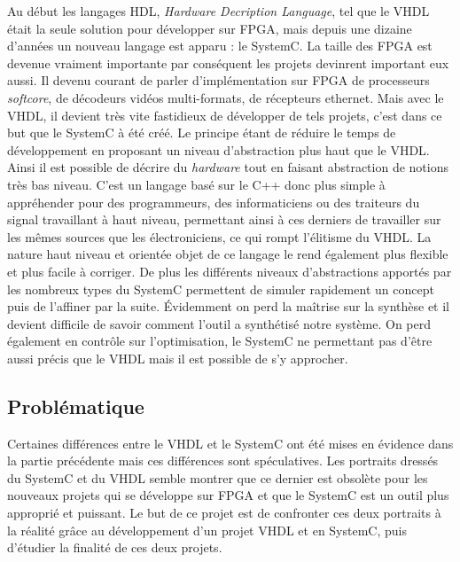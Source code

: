 \documentclass[a4paper,12pt]{article}
\begin{document}
Au début les langages HDL, \textit{Hardware Decription Language}, tel que le VHDL était la seule solution pour développer sur FPGA, mais depuis une dizaine d'années un nouveau langage est apparu : le SystemC. La taille des FPGA est devenue vraiment importante par conséquent les projets devinrent important eux aussi. Il devenu courant de parler d'implémentation sur FPGA de processeurs \textit{softcore}, de décodeurs vidéos multi-formats, de récepteurs ethernet. Mais avec le VHDL, il devient très vite fastidieux de développer de tels projets, c'est dans ce but que le SystemC à été créé. Le principe étant de réduire le temps de développement en proposant un niveau d'abstraction plus haut que le VHDL. Ainsi il est possible de décrire du \textit{hardware} tout en faisant abstraction de notions très bas niveau. C'est un langage basé sur le C++ donc plus simple à appréhender pour des programmeurs, des informaticiens ou des {\color{red}traiteurs du signal} travaillant à haut niveau, permettant ainsi à ces derniers de travailler sur les mêmes sources que les électroniciens, ce qui rompt l'élitisme du VHDL. La nature haut niveau et orientée objet de ce langage le rend également plus flexible et plus facile à corriger. De plus les différents niveaux d'abstractions apportés par les nombreux types du SystemC permettent de simuler rapidement un concept puis de l'affiner par la suite. Évidemment on perd la maîtrise sur la synthèse et il devient difficile de savoir comment l'outil a synthétisé notre système. On perd également en contrôle sur l'optimisation, le SystemC ne permettant pas d'être aussi précis que le VHDL mais il est possible de s'y approcher. 

\subsection{Problématique}

Certaines différences entre le VHDL et le SystemC ont été mises en évidence dans la partie précédente mais ces différences sont spéculatives. Les portraits dressés du SystemC et du VHDL semble montrer que ce dernier est obsolète pour les nouveaux projets qui se développe sur FPGA et que le SystemC est un outil plus approprié et puissant. Le but de ce projet est de confronter ces deux portraits à la réalité grâce au développement d'un projet VHDL et en SystemC, puis d'étudier la finalité de ces deux projets.\newline
\end{document}
